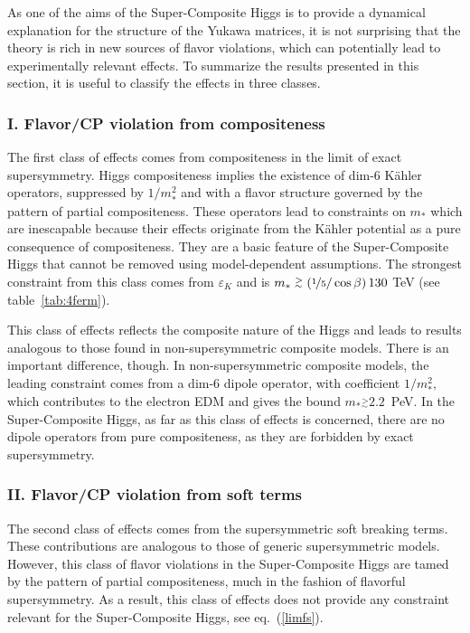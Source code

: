 \documentclass[a4paper,12pt]{article}
\newcommand{\gsim}{\stackrel{>}{_\sim}}
\def\eq#1{eq.~(\ref{#1})}
\def\tab#1{table~\ref{#1}}
\def\eq#1{eq.~(\ref{#1})}
\def\mst{m_*}
\begin{document}
{{{{As one of the aims of the Super-Composite Higgs is to provide a dynamical explanation for the structure of the Yukawa matrices, it is not surprising that the theory is rich in new sources of flavor violations, which can potentially lead to experimentally relevant effects. To summarize the results presented in this section, it is useful to classify the effects in three classes. 

\subsubsection*{I. Flavor/CP violation from compositeness}

The first class of effects comes from compositeness in the limit of exact supersymmetry. Higgs compositeness implies the existence of dim-6 K\"ahler operators, suppressed by $1/\mst^2$ and with a flavor structure governed by the pattern of partial compositeness. These operators lead to constraints on $\mst$ which are inescapable because their effects originate from the K\"ahler potential as a pure consequence of compositeness. They are a basic feature of the Super-Composite Higgs that cannot be removed using model-dependent assumptions. The strongest constraint from this class comes from $\varepsilon_K$ and is $\mst \gsim(\nicefrac{1}{5}/\cos\beta )\,130$ TeV (see \tab{tab:4ferm}). 

This class of effects reflects the composite nature of the Higgs and leads to results analogous to those found in non-supersymmetric composite models. There is an important difference, though. In non-supersymmetric composite models, the leading constraint comes from a dim-6 dipole operator, with coefficient $1/\mst^2$, which contributes to the electron EDM and gives the bound $\mst \gsim 2.2$~PeV. In the Super-Composite Higgs, as far as this class of effects is concerned, there are no dipole operators from pure compositeness, as they are forbidden by exact supersymmetry.

\subsubsection*{II. Flavor/CP violation from soft terms}

The second class of effects comes from the supersymmetric soft breaking terms. These contributions are analogous to those of generic supersymmetric models. However, this class of flavor violations in the Super-Composite Higgs are tamed by the pattern of partial compositeness, much in the fashion of flavorful supersymmetry. As a result, this class of effects does not provide any constraint relevant for the Super-Composite Higgs, see \eq{limfs}.

}}}}
\end{document}
